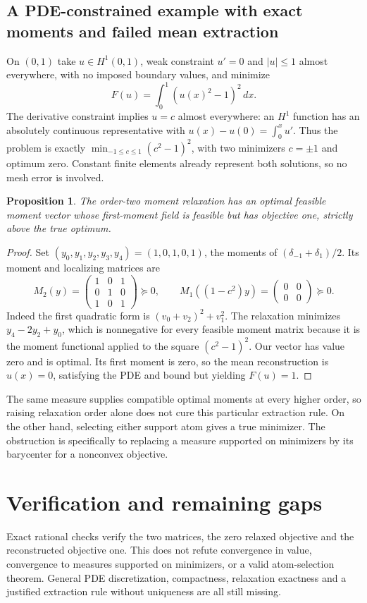 \documentclass[11pt]{article}
\newtheorem{proposition}{Proposition}
\begin{document}
\subsection{A PDE-constrained example with exact moments and failed mean extraction}
On $(0,1)$ take $u\in H^1(0,1)$, weak constraint $u'=0$ and $|u|\le1$ almost everywhere, with no imposed boundary values, and minimize
\[
 F(u)=\int_0^1(u(x)^2-1)^2\,dx.
\]
The derivative constraint implies $u=c$ almost everywhere: an $H^1$ function has an absolutely continuous representative with $u(x)-u(0)=\int_0^xu'$. Thus the problem is exactly $\min_{-1\le c\le1}(c^2-1)^2$, with two minimizers $c=\pm1$ and optimum zero. Constant finite elements already represent both solutions, so no mesh error is involved.
\begin{proposition}
The order-two moment relaxation has an optimal feasible moment vector whose first-moment field is feasible but has objective one, strictly above the true optimum.
\end{proposition}
\begin{proof}
Set $(y_0,y_1,y_2,y_3,y_4)=(1,0,1,0,1)$, the moments of $(\delta_{-1}+\delta_1)/2$. Its moment and localizing matrices are
\[
 M_2(y)=\begin{pmatrix}1&0&1\\0&1&0\\1&0&1\end{pmatrix}\succeq0,
 \qquad M_1((1-c^2)y)=\begin{pmatrix}0&0\\0&0\end{pmatrix}\succeq0.
\]
Indeed the first quadratic form is $(v_0+v_2)^2+v_1^2$. The relaxation minimizes $y_4-2y_2+y_0$, which is nonnegative for every feasible moment matrix because it is the moment functional applied to the square $(c^2-1)^2$. Our vector has value zero and is optimal. Its first moment is zero, so the mean reconstruction is $u(x)=0$, satisfying the PDE and bound but yielding $F(u)=1$.
\end{proof}
The same measure supplies compatible optimal moments at every higher order, so raising relaxation order alone does not cure this particular extraction rule. On the other hand, selecting either support atom gives a true minimizer. The obstruction is specifically to replacing a measure supported on minimizers by its barycenter for a nonconvex objective.
\section{Verification and remaining gaps}
Exact rational checks verify the two matrices, the zero relaxed objective and the reconstructed objective one. This does not refute convergence in value, convergence to measures supported on minimizers, or a valid atom-selection theorem. General PDE discretization, compactness, relaxation exactness and a justified extraction rule without uniqueness are all still missing.
\end{document}
